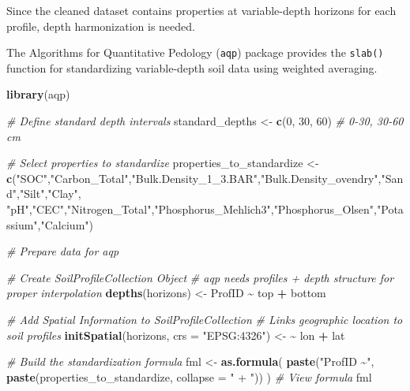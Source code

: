 \documentclass[
  10pt,
  b5paper,
  oneside]{book}
\newenvironment{Shaded}{\begin{snugshade}}{\end{snugshade}}
\newcommand{\AttributeTok}[1]{\textcolor[rgb]{0.13,0.29,0.53}{#1}}
\newcommand{\CommentTok}[1]{\textcolor[rgb]{0.56,0.35,0.01}{\textit{#1}}}
\newcommand{\DecValTok}[1]{\textcolor[rgb]{0.00,0.00,0.81}{#1}}
\newcommand{\ErrorTok}[1]{\textcolor[rgb]{0.64,0.00,0.00}{\textbf{#1}}}
\newcommand{\FunctionTok}[1]{\textcolor[rgb]{0.13,0.29,0.53}{\textbf{#1}}}
\newcommand{\NormalTok}[1]{#1}
\newcommand{\OtherTok}[1]{\textcolor[rgb]{0.56,0.35,0.01}{#1}}
\newcommand{\SpecialCharTok}[1]{\textcolor[rgb]{0.81,0.36,0.00}{\textbf{#1}}}
\newcommand{\StringTok}[1]{\textcolor[rgb]{0.31,0.60,0.02}{#1}}
\begin{document}
Since the cleaned dataset contains properties at variable-depth horizons for each profile, depth harmonization is needed.

The Algorithms for Quantitative Pedology (\texttt{aqp}) package provides the \texttt{slab()} function for standardizing variable-depth soil data using weighted averaging.

\begin{Shaded}
\begin{Highlighting}[]
\FunctionTok{library}\NormalTok{(aqp)}

\CommentTok{\# Define standard depth intervals}
\NormalTok{standard\_depths }\OtherTok{\textless{}{-}} \FunctionTok{c}\NormalTok{(}\DecValTok{0}\NormalTok{, }\DecValTok{30}\NormalTok{, }\DecValTok{60}\NormalTok{)  }\CommentTok{\# 0{-}30, 30{-}60 cm}

\CommentTok{\# Select properties to standardize}
\NormalTok{properties\_to\_standardize }\OtherTok{\textless{}{-}} \FunctionTok{c}\NormalTok{(}\StringTok{"SOC"}\NormalTok{,}\StringTok{"Carbon\_Total"}\NormalTok{,}\StringTok{"Bulk.Density\_1\_3.BAR"}\NormalTok{,}\StringTok{"Bulk.Density\_ovendry"}\NormalTok{,}\StringTok{"Sand"}\NormalTok{,}\StringTok{"Silt"}\NormalTok{,}\StringTok{"Clay"}\NormalTok{,}
                               \StringTok{"pH"}\NormalTok{,}\StringTok{"CEC"}\NormalTok{,}\StringTok{"Nitrogen\_Total"}\NormalTok{,}\StringTok{"Phosphorus\_Mehlich3"}\NormalTok{,}\StringTok{"Phosphorus\_Olsen"}\NormalTok{,}\StringTok{"Potassium"}\NormalTok{,}\StringTok{"Calcium"}\NormalTok{)}

\CommentTok{\# Prepare data for aqp}

\CommentTok{\# Create SoilProfileCollection Object}
\CommentTok{\# aqp needs profiles + depth structure for proper interpolation}
\FunctionTok{depths}\NormalTok{(horizons) }\OtherTok{\textless{}{-}}\NormalTok{ ProfID }\SpecialCharTok{\textasciitilde{}}\NormalTok{ top }\SpecialCharTok{+}\NormalTok{ bottom}

\CommentTok{\# Add Spatial Information to SoilProfileCollection}
\CommentTok{\#   Links geographic location to soil profiles}
\FunctionTok{initSpatial}\NormalTok{(horizons, }\AttributeTok{crs =} \StringTok{"EPSG:4326"}\NormalTok{) }\OtherTok{\textless{}{-}} \ErrorTok{\textasciitilde{}}\NormalTok{ lon }\SpecialCharTok{+}\NormalTok{ lat}

\CommentTok{\# Build the standardization formula}
\NormalTok{fml }\OtherTok{\textless{}{-}} \FunctionTok{as.formula}\NormalTok{(}
  \FunctionTok{paste}\NormalTok{(}\StringTok{"ProfID \textasciitilde{}"}\NormalTok{, }\FunctionTok{paste}\NormalTok{(properties\_to\_standardize, }\AttributeTok{collapse =} \StringTok{" + "}\NormalTok{))}
\NormalTok{)}
\CommentTok{\# View formula}
\NormalTok{fml}


\end{Highlighting}
\end{Shaded}
\end{document}

